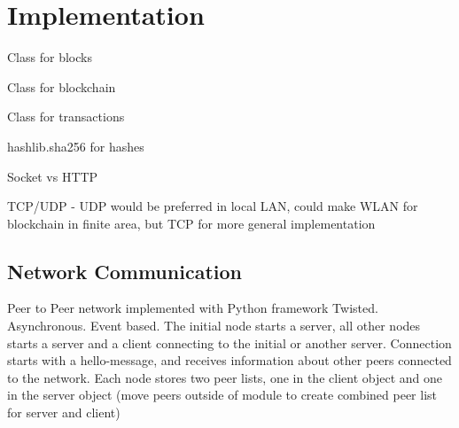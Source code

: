 \chapter{Implementation}

Class for blocks

Class for blockchain

Class for transactions

hashlib.sha256 for hashes 


Socket vs HTTP

TCP/UDP - UDP would be preferred in local LAN, could make WLAN for blockchain in finite area, but TCP for more general implementation 

\section{Network Communication}
Peer to Peer network implemented with Python framework Twisted. Asynchronous. Event based. The initial node starts a server, all other nodes starts a server and a client connecting to the initial or another server. Connection starts with a hello-message, and receives information about other peers connected to the network. Each node stores two peer lists, one in the client object and one in the server object (move peers outside of module to create combined peer list for server and client)